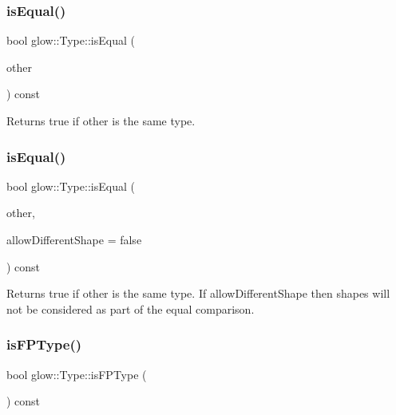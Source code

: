 \subsubsection{\texorpdfstring{is\+Equal()}{isEqual()}\hspace{0.1cm}{\footnotesize\ttfamily [1/2]}}
{\footnotesize\ttfamily bool glow\+::\+Type\+::is\+Equal (\begin{DoxyParamCaption}\item[{\hyperlink{structglow_1_1_type}{Type\+Ref}}]{other }\end{DoxyParamCaption}) const\hspace{0.3cm}{\ttfamily [inline]}}

\begin{DoxyReturn}{Returns}
true if {\ttfamily other} is the same type. 
\end{DoxyReturn}
\mbox{\label{structglow_1_1_type_a1a9738606ca71d158222ca781657b941}} 
\subsubsection{\texorpdfstring{is\+Equal()}{isEqual()}\hspace{0.1cm}{\footnotesize\ttfamily [2/2]}}
{\footnotesize\ttfamily bool glow\+::\+Type\+::is\+Equal (\begin{DoxyParamCaption}\item[{const \hyperlink{structglow_1_1_type}{Type} \&}]{other,  }\item[{bool}]{allow\+Different\+Shape = {\ttfamily false} }\end{DoxyParamCaption}) const\hspace{0.3cm}{\ttfamily [inline]}}

\begin{DoxyReturn}{Returns}
true if {\ttfamily other} is the same type. If {\ttfamily allow\+Different\+Shape} then shapes will not be considered as part of the equal comparison. 
\end{DoxyReturn}
\mbox{\label{structglow_1_1_type_a3e5b4d7754eb3d94b85eac664235ad67}} 
\subsubsection{\texorpdfstring{is\+F\+P\+Type()}{isFPType()}}
{\footnotesize\ttfamily bool glow\+::\+Type\+::is\+F\+P\+Type (\begin{DoxyParamCaption}{ }\end{DoxyParamCaption}) const\hspace{0.3cm}{\ttfamily [inline]}}

